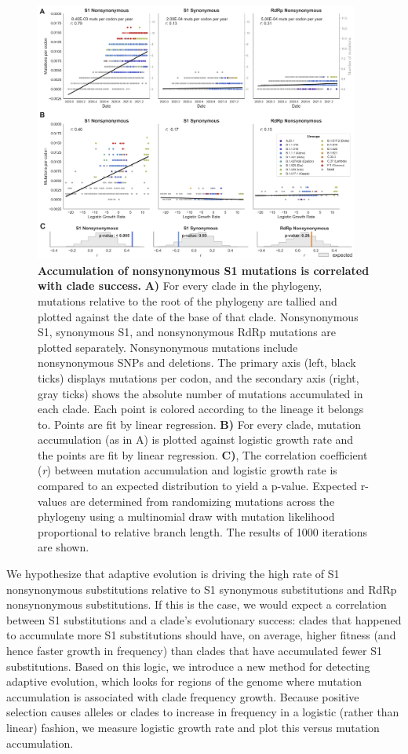 \documentclass[12pt, letterpaper]{article}
\begin{document}
\begin{figure}[h!]
	\centerline{\includegraphics[width=0.95\textwidth]{fig1.png}}
	\caption{\textbf{Accumulation of nonsynonymous S1 mutations is correlated with clade success.}
	\textbf{A)} For every clade in the phylogeny, mutations relative to the root of the phylogeny are tallied and plotted against the date of the base of that clade. Nonsynonymous S1, synonymous S1, and nonsynonymous RdRp mutations are plotted separately. Nonsynonymous mutations include nonsynonymous SNPs and deletions. The primary axis (left, black ticks) displays mutations per codon, and the secondary axis (right, gray ticks) shows the absolute number of mutations accumulated in each clade. Each point is colored according to the lineage it belongs to. Points are fit by linear regression. \textbf{B)} For every clade, mutation accumulation (as in A) is plotted against logistic growth rate and the points are fit by linear regression. \textbf{C)}, The correlation coefficient (\emph{r}) between mutation accumulation and logistic growth rate is compared to an expected distribution to yield a p-value. Expected r-values are determined from randomizing mutations across the phylogeny using a multinomial draw with mutation likelihood proportional to relative branch length. The results of 1000 iterations are shown.
	}
	\label{fig:fig1}
\end{figure}

We hypothesize that adaptive evolution is driving the high rate of S1 nonsynonymous substitutions relative to S1 synonymous substitutions and RdRp nonsynonymous substitutions. If this is the case, we would expect a correlation between S1 substitutions and a clade’s evolutionary success: clades that happened to accumulate more S1 substitutions should have, on average, higher fitness (and hence faster growth in frequency) than clades that have accumulated fewer S1 substitutions. Based on this logic, we introduce a new method for detecting adaptive evolution, which looks for regions of the genome where mutation accumulation is associated with clade frequency growth. Because positive selection causes alleles or clades to increase in frequency in a logistic (rather than linear) fashion, we measure logistic growth rate and plot this versus mutation accumulation.
\end{document}
